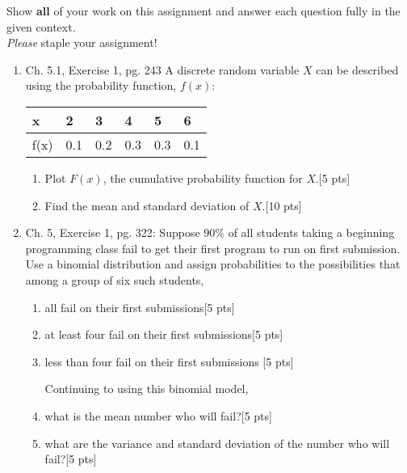 \documentclass[11pt]{article}\usepackage[]{graphicx}\usepackage[]{color}
\begin{document}

\pagestyle{fancy} 

Show \textbf{all} of your work on this assignment and answer each question fully in the given context. \\


\emph{Please} staple your assignment!

\begin{enumerate}
	

	
	\item Ch. 5.1, Exercise 1, pg. 243 A discrete random variable $X$ can be described using the probability function, $f(x)$:


 \begin{table}[h!]
     \centering
     \begin{tabular}{llllll}
        \hline
         x  & 2  & 3 &  4  & 5 & 6     \\\hline \hline
         f(x) & 0.1 &  0.2 & 0.3  & 0.3 &  0.1  \\\hline \hline

     \end{tabular}
  \end{table}
    
    \begin{enumerate}
          \item  Plot $F(x)$, the cumulative probability function for $X$.[5 pts]
          
          \item Find the mean and standard deviation of $X$.[10 pts]
    \end{enumerate}      
    	
	
	
	\item Ch. 5, Exercise 1, pg. 322: Suppose $90\%$ of all students taking a beginning programming class fail to get their first program to run on first submission. Use a binomial distribution and assign probabilities to the possibilities that among a group of six such students,
	\begin{enumerate}
        \item all fail on their first submissions[5 pts]
        \item  at least four fail on their first submissions[5 pts]
        \item  less than four fail on their first submissions [5 pts] 
    
Continuing to using this binomial model,
        \item what is the mean number who will fail?[5 pts]
        \item what are the variance and standard deviation of the number who will fail?[5 pts]
  \end{enumerate}



\end{enumerate}
\end{document}
